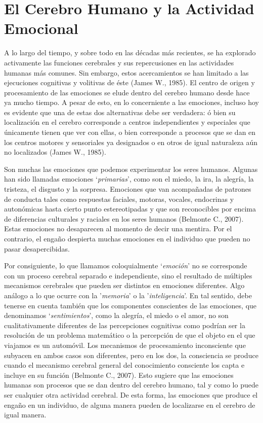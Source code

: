 \section{El Cerebro Humano y la Actividad Emocional}
A lo largo del tiempo, y sobre todo en las décadas más recientes, se ha explorado activamente las funciones cerebrales y sus repercusiones en las actividades humanas más comunes. Sin embargo, estos acercamientos se han limitado a las ejecuciones cognitivas y volitivas de éste (James W., 1985). El centro de origen y procesamiento de las emociones se elude dentro del cerebro humano desde hace ya mucho tiempo. A pesar de esto, en lo concerniente a las emociones, incluso hoy es evidente que una de estas dos alternativas debe ser verdadera: ó bien su localización en el cerebro corresponde a centros independientes y especiales que únicamente tienen que ver con ellas, o bien corresponde a procesos que se dan en los centros motores y sensoriales ya designados o en otros de igual naturaleza aún no localizados (James W., 1985).

Son muchas las emociones que podemos experimentar los seres humanos. Algunas han sido llamadas emociones  ‘\textit{primarias}’, como son el miedo, la ira, la alegría, la tristeza, el disgusto y la sorpresa. Emociones que  van  acompañadas de patrones de conducta tales como respuestas faciales, motoras, vocales, endocrinas y autonómicas hasta cierto punto estereotipadas y que son reconocibles por encima de diferencias culturales y raciales en los seres humanos (Belmonte C., 2007). Estas emociones no desaparecen al momento de decir una mentira. Por el contrario, el engaño despierta muchas emociones en el individuo que pueden no pasar desapercibidas.

Por consiguiente, lo que llamamos coloquialmente ‘\textit{emoción}’ no se corresponde con un proceso cerebral separado e independiente, sino el resultado de múltiples mecanismos cerebrales que pueden  ser  distintos en emociones diferentes. Algo análogo a lo que ocurre  con  la  '\textit{memoria}’ o la  '\textit{inteligencia}’. En tal sentido, debe  tenerse  en  cuenta  también  que  los  componentes conscientes de las emociones,  que  denominamos  ‘\textit{sentimientos}’,  como  la  alegría,  el  miedo  o  el amor,  no  son  cualitativamente  diferentes  de  las  percepciones  cognitivas  como  podrían  ser  la  resolución de un problema matemático o la percepción de que el objeto en el que viajamos es un automóvil. Los mecanismos  de  procesamiento  inconsciente  que  subyacen en  ambos  casos  son  diferentes, pero en los dos, la consciencia se produce cuando el mecanismo cerebral general del conocimiento consciente los capta e incluye en su función (Belmonte C., 2007). Esto sugiere que las emociones humanas son procesos que se dan dentro del cerebro humano, tal y como lo puede ser cualquier otra actividad cerebral. De esta forma, las emociones que produce el engaño en un individuo, de alguna manera pueden de localizarse en el cerebro de igual manera.

